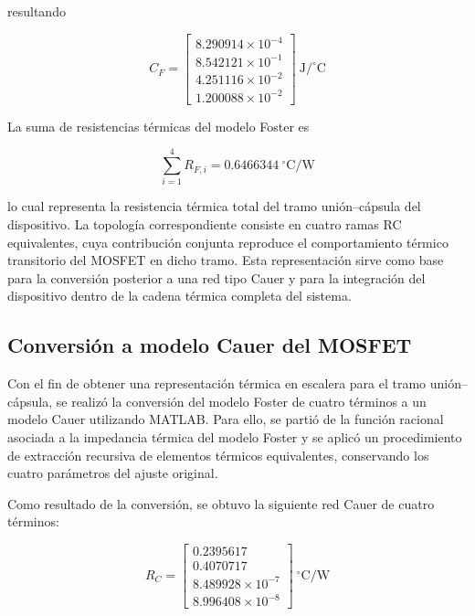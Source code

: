\documentclass[journal]{IEEEtran}
\begin{document}
resultando

\begin{equation}
C_F=
\left[
\begin{array}{c}
8.290914\times10^{-4}\\
8.542121\times10^{-1}\\
4.251116\times10^{-2}\\
1.200088\times10^{-2}
\end{array}
\right]
\ \mathrm{J/^\circ C}
\label{eq:cf_mosfet}
\end{equation}

La suma de resistencias térmicas del modelo Foster es

\begin{equation}
\sum_{i=1}^{4} R_{F,i}=0.6466344\ ^\circ\mathrm{C/W}
\label{eq:sum_rf}
\end{equation}

lo cual representa la resistencia térmica total del tramo unión--cápsula del dispositivo. La topología correspondiente consiste en cuatro ramas RC equivalentes, cuya contribución conjunta reproduce el comportamiento térmico transitorio del MOSFET en dicho tramo. Esta representación sirve como base para la conversión posterior a una red tipo Cauer y para la integración del dispositivo dentro de la cadena térmica completa del sistema.



\subsection{Conversión a modelo Cauer del MOSFET}

Con el fin de obtener una representación térmica en escalera para el tramo unión--cápsula, se realizó la conversión del modelo Foster de cuatro términos a un modelo Cauer utilizando MATLAB. Para ello, se partió de la función racional asociada a la impedancia térmica del modelo Foster y se aplicó un procedimiento de extracción recursiva de elementos térmicos equivalentes, conservando los cuatro parámetros del ajuste original.

Como resultado de la conversión, se obtuvo la siguiente red Cauer de cuatro términos:

\begin{equation}
R_C=
\left[
\begin{array}{c}
0.2395617\\
0.4070717\\
8.489928\times10^{-7}\\
8.996408\times10^{-8}
\end{array}
\right]
\ ^\circ\mathrm{C/W}
\label{eq:rc_mosfet}
\end{equation}
\end{document}
